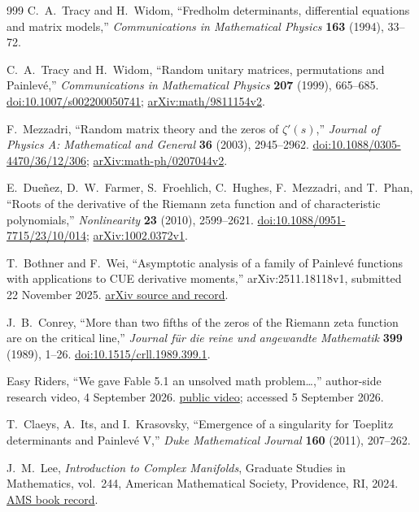 \begin{thebibliography}{999}
C.~A.~Tracy and H.~Widom,
``Fredholm determinants, differential equations and matrix models,''
\emph{Communications in Mathematical Physics} \textbf{163} (1994), 33--72.

C.~A.~Tracy and H.~Widom,
``Random unitary matrices, permutations and Painlev\'e,''
\emph{Communications in Mathematical Physics} \textbf{207} (1999), 665--685.
\href{https://doi.org/10.1007/s002200050741}{doi:10.1007/s002200050741};
\href{https://arxiv.org/abs/math/9811154}{arXiv:math/9811154v2}.

F.~Mezzadri,
``Random matrix theory and the zeros of $\zeta'(s)$,''
\emph{Journal of Physics A: Mathematical and General} \textbf{36} (2003),
2945--2962.
\href{https://doi.org/10.1088/0305-4470/36/12/306}
{doi:10.1088/0305-4470/36/12/306};
\href{https://arxiv.org/abs/math-ph/0207044}{arXiv:math-ph/0207044v2}.

E.~Due\~nez, D.~W.~Farmer, S.~Froehlich, C.~Hughes, F.~Mezzadri, and T.~Phan,
``Roots of the derivative of the Riemann zeta function and of characteristic
polynomials,''
\emph{Nonlinearity} \textbf{23} (2010), 2599--2621.
\href{https://doi.org/10.1088/0951-7715/23/10/014}
{doi:10.1088/0951-7715/23/10/014};
\href{https://arxiv.org/abs/1002.0372}{arXiv:1002.0372v1}.

T.~Bothner and F.~Wei,
``Asymptotic analysis of a family of Painlev\'e functions with applications to
CUE derivative moments,''
arXiv:2511.18118v1, submitted 22 November 2025.
\href{https://arxiv.org/abs/2511.18118}{arXiv source and record}.

J.~B.~Conrey,
``More than two fifths of the zeros of the Riemann zeta function are on the
critical line,''
\emph{Journal f\"ur die reine und angewandte Mathematik} \textbf{399} (1989),
1--26.
\href{https://doi.org/10.1515/crll.1989.399.1}
{doi:10.1515/crll.1989.399.1}.

Easy Riders,
``We gave Fable 5.1 an unsolved math problem\ldots,''
author-side research video, 4 September 2026.
\href{https://www.youtube.com/watch?v=LHXfb0LYsX8}{public video};
accessed 5 September 2026.

T.~Claeys, A.~Its, and I.~Krasovsky,
``Emergence of a singularity for Toeplitz determinants and Painlev\'e V,''
\emph{Duke Mathematical Journal} \textbf{160} (2011), 207--262.

J.~M.~Lee,
\emph{Introduction to Complex Manifolds},
Graduate Studies in Mathematics, vol.~244,
American Mathematical Society, Providence, RI, 2024.
\href{https://bookstore.ams.org/GSM/244}{AMS book record}.


\end{thebibliography}
